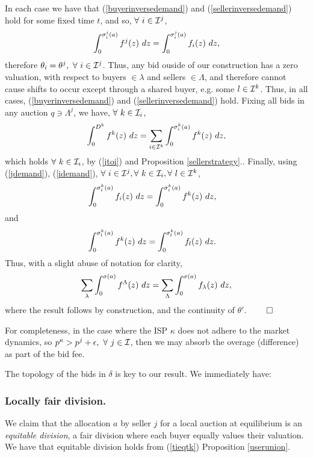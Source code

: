 {In each case we
have that (\ref{buyerinversedemand}) and (\ref{sellerinversedemand}) hold for
some fixed time $t$, and so, $\forall \ i \in\mathcal{I}^j$,
\begin{equation}\label{jdemand}
    \int_0^{\sigma_i^j(a)} f^j(z) \ dz 
    = \int_0^{\sigma_i^j(a)} f_i(z) \ dz,
\end{equation}
therefore $\theta_i = \theta^j, \ \forall \ i \in \mathcal{I}^j$.
Thus, any bid ouside of
our construction
has a zero valuation, with respect to buyers $\in\lambda$ and sellers
$\in\Lambda$, and therefore cannot cause shifts to occur except through a
shared buyer, e.g. some $l\in\mathcal{I}^k$. Thus, in all cases,
(\ref{buyerinversedemand}) and (\ref{sellerinversedemand}) hold. Fixing all
bids in any auction $q \ni \Lambda^j$,
we have, $\forall \ k\in\mcI_i$,
\begin{equation}\label{idemand}
    \displaystyle\int_0^{D^k} f^k(z) \ dz = \sum_{i\in\mathcal{I}^k}\int_0^{\sigma_i^k(a)}
f^k(z) \ dz,
\end{equation}
which holds $\forall \ k\in\mcI_i$, by (\ref{jtoi}) and Proposition
\ref{sellerstrategy}..
Finally, using (\ref{jdemand}), (\ref{idemand}), $\forall \ i\in\mathcal{I}^j, \forall \ k\in\mathcal{I}_i,\forall \ l\in\mathcal{I}^k$,
\begin{align}\label{tieqtk}
    \int_0^{\g_i^k(a)} f_i(z) \ dz &= \int_0^{\g_i^k(a)} f^k(z) \ dz,
\end{align}
and
\begin{align}\label{tkeqtl}
    \int_0^{\g_l^k(a)} f^k(z) \ dz &= \int_0^{\g_l^k(a)} f_l(z) \ dz.
\end{align}
Thus, with a slight abuse of notation for clarity,
\begin{equation}\label{funion-eq}
    \sum_{\lambda}\int_0^{\sigma(a)} f^\Lambda(z) \ dz =
\sum_{\Lambda}\int_0^{\sigma(a)} f_\lambda(z) \ dz,
\end{equation}
where the result follows by construction, and the continuity of $\theta'$.
$\qed$}

For completeness, in the case where the ISP $\kappa$ 
does not adhere to the market dynamics, so $p^\kappa > p^j +
\epsilon, \ \forall \ j \in\mathcal{I}$, then we may absorb the overage (difference) as part of the
bid fee.

The topology of the bids in $\delta$ is key to our result. We immediately have:

\subsubsection{Locally fair division.}
We claim that the allocation $a$ by seller $j$ for a local auction at
equilibrium is an \emph{equitable division}, a fair division where each buyer
equally values their valuation. We have that equitable division holds from
(\ref{tieqtk}) Proposition \ref{userunion}. 

